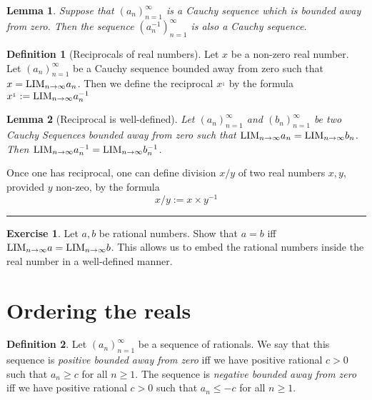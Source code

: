 \documentclass[
]{book}
\newtheorem{lemma}{Lemma}[chapter]
\theoremstyle{definition}
\newtheorem{definition}{Definition}[chapter]
\theoremstyle{definition}
\theoremstyle{definition}
\newtheorem{exercise}{Exercise}[chapter]
\theoremstyle{definition}
\theoremstyle{remark}
\begin{document}
\begin{lemma}
Suppose that \((a_n)_{n=1}^{\infty}\) is a Cauchy sequence which is bounded away from zero. Then the sequence \((a_n^{-1})_{n=1}^{\infty}\) is also a Cauchy sequence.
\end{lemma}

\begin{definition}[Reciprocals of real numbers]
Let \(x\) be a non-zero real number. Let \((a_n)_{n=1}^{\infty}\) be a Cauchy sequence bounded away from zero such that \(x={\rm LIM}_{n\to \infty}a_n\). Then we define the reciprocal \(x^{_1}\) by the formula \(x^{_1}:={\rm LIM}_{n\to \infty}a_n^{-1}\)
\end{definition}

\begin{lemma}[Reciprocal is well-defined]
Let \((a_n)_{n=1}^{\infty}\) and \((b_n)_{n=1}^{\infty}\) be two Cauchy Sequences bounded away from zero such that \({\rm LIM}_{n\to \infty}a_n={\rm LIM}_{n\to \infty}b_n\). Then \({\rm LIM}_{n\to \infty}a^{-1}_n={\rm LIM}_{n\to \infty}b^{-1}_n\).
\end{lemma}

Once one has reciprocal, one can define division \(x/y\) of two real numbers \(x,y\), provided \(y\) non-zeo, by the formula
\[
x/y:=x\times y^{-1}
\]

\begin{center}\rule{0.5\linewidth}{0.5pt}\end{center}

\begin{exercise}
Let \(a,b\) be rational numbers. Show that \(a=b\) iff \({\rm LIM}_{n\to \infty}a= {\rm LIM}_{n\to \infty}b\). This allows us to embed the rational numbers inside the real number in a well-defined manner.
\end{exercise}

\section{Ordering the reals}\label{ordering-the-reals}

\begin{definition}
Let \((a_n)_{n=1}^{\infty}\) be a sequence of rationals. We say that this sequence is \emph{positive bounded away from zero} iff we have positive rational \(c>0\) such that \(a_n\geq c\) for all \(n\geq 1\). The sequence is \emph{negative bounded away from zero} iff we have positive rational \(c>0\) such that \(a_n\leq -c\) for all \(n\geq 1\).
\end{definition}
\end{document}
